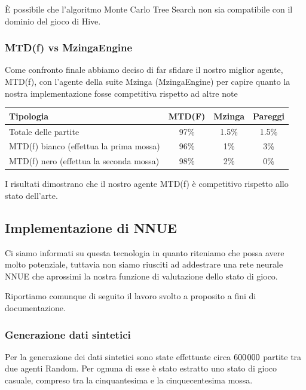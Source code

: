 \documentclass[a4paper,12pt]{article}
\begin{document}
    È possibile che l'algoritmo Monte Carlo Tree Search non sia compatibile con il dominio del gioco di Hive.

    \subsubsection{MTD(f) vs MzingaEngine}

    Come confronto finale abbiamo deciso di far sfidare il nostro miglior agente, MTD(f), con l'agente della suite Mzinga (MzingaEngine) per capire quanto la nostra implementazione fosse competitiva rispetto ad altre note

    \begin{table}[h]
        \begin{center}
            \begin{tabular}{||l|c|c|c||}
                \hline
                Tipologia                               & MTD(F) & Mzinga & Pareggi \\ \hline
                Totale delle partite                    & 97\%   & 1.5\%  & 1.5\%   \\
                MTD(f) bianco (effettua la prima mossa) & 96\%   & 1\%    & 3\%     \\
                MTD(f) nero (effettua la seconda mossa) & 98\%   & 2\%    & 0\%     \\ \hline
            \end{tabular}
        \end{center}
    \end{table}


    I risultati dimostrano che il nostro agente MTD(f) è competitivo rispetto allo stato dell'arte.


    \newpage

    \subsection{Implementazione di NNUE}
    Ci siamo informati su questa tecnologia in quanto riteniamo che possa avere molto potenziale, tuttavia non siamo riusciti ad addestrare una rete neurale NNUE che aprossimi la nostra funzione di valutazione dello stato di gioco.

    Riportiamo comunque di seguito il lavoro svolto a proposito a fini di documentazione.

    \subsubsection{Generazione dati sintetici}
    Per la generazione dei dati sintetici sono state effettuate circa $600\hspace{1px}000$ partite tra due agenti Random. Per ognuna di esse è stato estratto uno stato di gioco casuale, compreso tra la cinquantesima e la cinquecentesima mossa.
\end{document}
